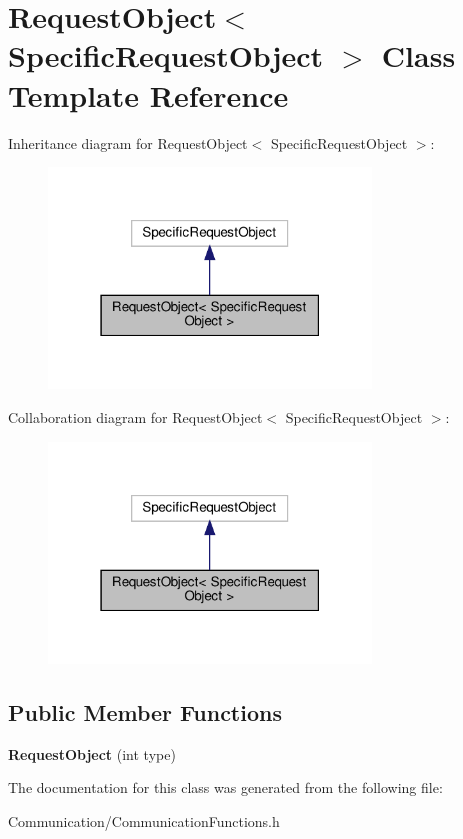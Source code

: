 \hypertarget{classRequestObject}{}\section{Request\+Object$<$ Specific\+Request\+Object $>$ Class Template Reference}
\label{classRequestObject}


Inheritance diagram for Request\+Object$<$ Specific\+Request\+Object $>$\+:
\nopagebreak
\begin{figure}[H]
\begin{center}
\leavevmode
\includegraphics[width=243pt]{classRequestObject__inherit__graph}
\end{center}
\end{figure}


Collaboration diagram for Request\+Object$<$ Specific\+Request\+Object $>$\+:
\nopagebreak
\begin{figure}[H]
\begin{center}
\leavevmode
\includegraphics[width=243pt]{classRequestObject__coll__graph}
\end{center}
\end{figure}
\subsection*{Public Member Functions}
\begin{DoxyCompactItemize}
\item 
\mbox{\label{classRequestObject_a44075701922d4926e899519df2ce5aed}} 
{\bfseries Request\+Object} (int type)
\end{DoxyCompactItemize}


The documentation for this class was generated from the following file\+:\begin{DoxyCompactItemize}
\item 
Communication/Communication\+Functions.\+h\end{DoxyCompactItemize}
